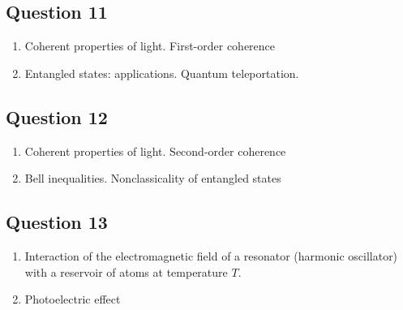 \documentclass[12pt,a4paper]{article}
\begin{document}
\subsection*{Question 11} 
\begin{enumerate}
\item Coherent properties of light. First-order coherence
\item Entangled states: applications. Quantum
  teleportation.
\end{enumerate}

\subsection*{Question 12} 
\begin{enumerate}
\item Coherent properties of light. Second-order coherence
\item Bell inequalities. Nonclassicality of entangled states
\end{enumerate}

\subsection*{Question 13} 
\begin{enumerate}
\item Interaction of the electromagnetic field of a resonator
  (harmonic oscillator) with a reservoir of atoms at
  temperature $T$.
\item Photoelectric effect
\end{enumerate}
\end{document}
